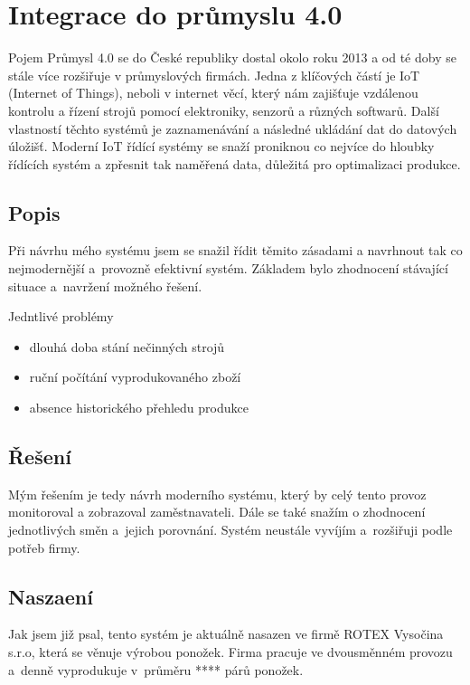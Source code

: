 \chapter{Integrace do průmyslu 4.0}
Pojem Průmysl 4.0 se do České republiky dostal okolo roku 2013 a od té doby se stále více rozšiřuje v průmyslových firmách.
Jedna z klíčových částí je IoT (Internet of Things), neboli v internet věcí, který nám zajišťuje vzdálenou kontrolu a řízení strojů pomocí elektroniky, senzorů a různých softwarů.
Další vlastností těchto systémů je zaznamenávání a následné ukládání dat do datových úložišť.
Moderní IoT řídící systémy se snaží proniknou co nejvíce do hloubky řídících systém a zpřesnit tak naměřená data, důležitá pro optimalizaci produkce.   

\section{Popis}
Při návrhu mého systému jsem se snažil řídit těmito zásadami a navrhnout tak co nejmodernější a~provozně efektivní systém.
Základem bylo zhodnocení stávající situace a~navržení možného řešení.

Jedntlivé problémy
\begin{itemize}
    \item dlouhá doba stání nečinných strojů
    \item ruční počítání vyprodukovaného zboží
    \item absence historického přehledu produkce
\end{itemize}

\section{Řešení}
Mým řešením je tedy návrh moderního systému, který by celý tento provoz monitoroval a zobrazoval zaměstnavateli.
Dále se také snažím o zhodnocení jednotlivých směn a~jejich porovnání.
Systém neustále vyvíjím a~rozšiřuji podle potřeb firmy.

\section{Naszaení}
Jak jsem již psal, tento systém je aktuálně nasazen ve firmě ROTEX Vysočina s.r.o\cite{ROTEX}, která se věnuje výrobou ponožek. 
Firma pracuje ve dvousměnném provozu a~denně vyprodukuje v~průměru **** párů ponožek. 

